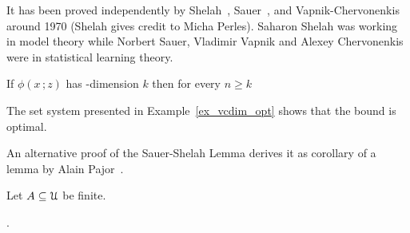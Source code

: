 \documentclass[scombinatorics.tex]{subfiles}
\begin{document}
It has been proved independently by Shelah~\cite{shelah72}, Sauer~\cite{sauer}, and Vapnik-Cher\-vo\-nen\-kis~\cite{VC} around 1970 (Shelah gives credit to Micha Perles).
Saharon Shelah was working in model theory while Norbert Sauer, Vladimir Vapnik and Alexey Chervonenkis were in statistical learning theory.

\begin{void_thm}\label{lem_sauer}
If $\phi(x\,;z)$ has \vc-dimension $k$ then for every $n\ge k$

\QED 
\end{void_thm}

The set system presented in Example~\ref{ex_vcdim_opt} shows that the bound is optimal.

An alternative proof of the Sauer-Shelah Lemma derives it as corollary of a lemma by Alain Pajor~\cite{pajor}.


\begin{void_thm}\label{lem_pajor}
  Let $A\subseteq\EuScript U$ be finite.
  
  .
\end{void_thm}
\end{document}
